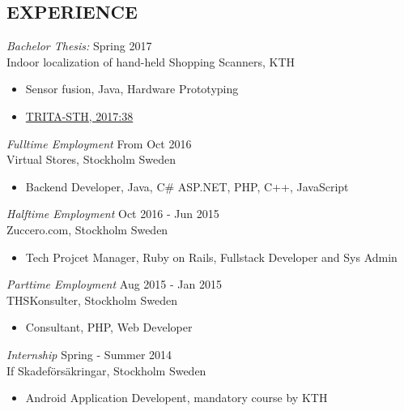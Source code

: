 \documentclass[margin]{res}
\begin{document}
\begin{resume}
 
\section{EXPERIENCE}
{\sl Bachelor Thesis: } \hfill Spring 2017\\
Indoor localization of hand-held Shopping Scanners, KTH
 \begin{itemize} \itemsep -2pt
                \item Sensor fusion, Java, Hardware Prototyping \hfill 
                \item \href{http://kth.diva-portal.org/smash/record.jsf?pid=diva2\%3A1108974}{TRITA-STH, 2017:38} \hfill 
                \end{itemize}
{\sl Fulltime Employment } \hfill From Oct 2016 \\
                Virtual Stores, Stockholm Sweden
                \begin{itemize} \itemsep -2pt
                \item Backend Developer, Java, C\# ASP.NET, PHP, C++, JavaScript\hfill 
                \end{itemize}
{\sl Halftime Employment } \hfill  Oct 2016 - Jun 2015 \\
                Zuccero.com, Stockholm Sweden
                 \begin{itemize}  \itemsep -2pt %
                 \item  Tech Projcet Manager, Ruby on Rails, Fullstack Developer and Sys Admin\hfill 
                \end{itemize}
{\sl Parttime Employment } \hfill  Aug 2015 - Jan 2015 \\
                THSKonsulter, Stockholm Sweden
                 \begin{itemize}  \itemsep -2pt %
                 \item  Consultant, PHP, Web Developer\hfill 
                \end{itemize}
    {\sl Internship } \hfill Spring - Summer 2014 \\
                If Skadeförsäkringar, Stockholm Sweden
                 \begin{itemize}  \itemsep -2pt %
                 \item Android Application Developent, mandatory course by KTH 
                \end{itemize}


\end{resume}
\end{document}
